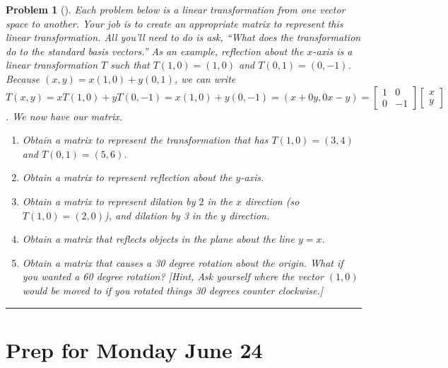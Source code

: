 \documentclass[letterpaper,oneside]{book}%
\theoremstyle{plain}
\theoremstyle{box}
\theoremstyle{problem}
\newtheorem{problemnum}{Problem}[chapter]
\newenvironment{problem}[1][]{\begin{problemnum}[#1]}{\end{problemnum}\nopagebreak\hrule\bigskip}
\newcommand{\bvec}[1]{\begin{bmatrix} #1 \end{bmatrix}}
\begin{document}
\begin{problem}
 Each problem below is a linear transformation from one vector space to another.  Your job is to create an appropriate matrix to represent this linear transformation. All you'll need to do is ask, ``What does the transformation do to the standard basis vectors.''  As an example, reflection about the $x$-axis is a linear transformation $T$ such that $T(1,0)=(1,0)$ and $T(0,1)=(0,-1)$. Because $(x,y)=x(1,0)+y(0,1)$, we can write $T(x,y) = xT(1,0)+yT(0,-1) = x(1,0)+y(0,-1) = (x+0y,0x-y) = \bvec{1&0\\0&-1}\bvec{x\\y}$.  We now have our matrix.  
 \begin{enumerate}
  \item Obtain a matrix to represent the transformation that has $T(1,0) = (3,4)$ and $T(0,1)=(5,6)$. 
  \item Obtain a matrix to represent reflection about the $y$-axis.  
  \item Obtain a matrix to represent dilation by $2$ in the $x$ direction (so $T(1,0)=(2,0)$), and dilation by 3 in the $y$ direction. 
  \item Obtain a matrix that reflects objects in the plane about the line $y=x$. 
  \item Obtain a matrix that causes a 30 degree rotation about the origin. What if you wanted a 60 degree rotation?  [Hint, Ask yourself where the vector $(1,0)$ would be moved to if you rotated things 30 degrees counter clockwise.] 
 \end{enumerate}
\end{problem}





















\section{Prep for Monday June 24}
\end{document}
